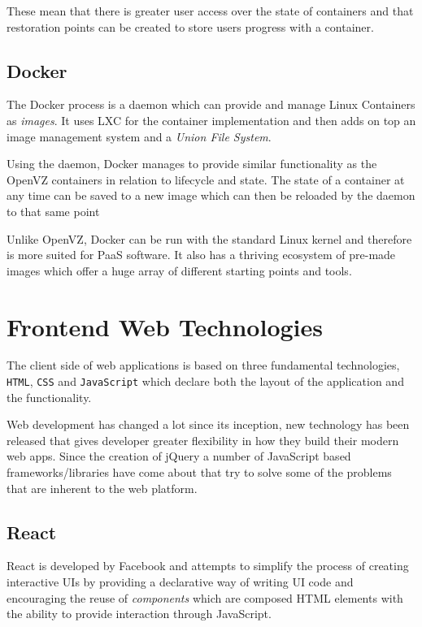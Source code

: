 These mean that there is greater user access over the state of containers and that restoration points can be created to store users progress with a container.

\subsection{Docker}

The Docker process is a daemon which can provide and manage Linux Containers as \textit{images}. It uses LXC for the container implementation and then adds on top an image management system and a \textit{Union File System}.

Using the daemon, Docker manages to provide similar functionality as the OpenVZ containers in relation to lifecycle and state. The state of a container at any time can be saved to a new image which can then be reloaded by the daemon to that same point

Unlike OpenVZ, Docker can be run with the standard Linux kernel and therefore is more suited for PaaS software. It also has a thriving ecosystem of pre-made images which offer a huge array of different starting points and tools.


\section{Frontend Web Technologies} \label{lit-frontend}

The client side of web applications is based on three fundamental technologies, \texttt{HTML}, \texttt{CSS} and \texttt{JavaScript} which declare both the layout of the application and the functionality.

Web development has changed a lot since its inception, new technology has been released that gives developer greater flexibility in how they build their modern web apps. Since the creation of jQuery \cite{jquery} a number of JavaScript based frameworks/libraries have come about that try to solve some of the problems that are inherent to the web platform.

\subsection{React}

React is developed by Facebook and attempts to simplify the process of creating interactive UIs by providing a declarative way of writing UI code and encouraging the reuse of \textit{components} which are composed HTML elements with the ability to provide interaction through JavaScript.

